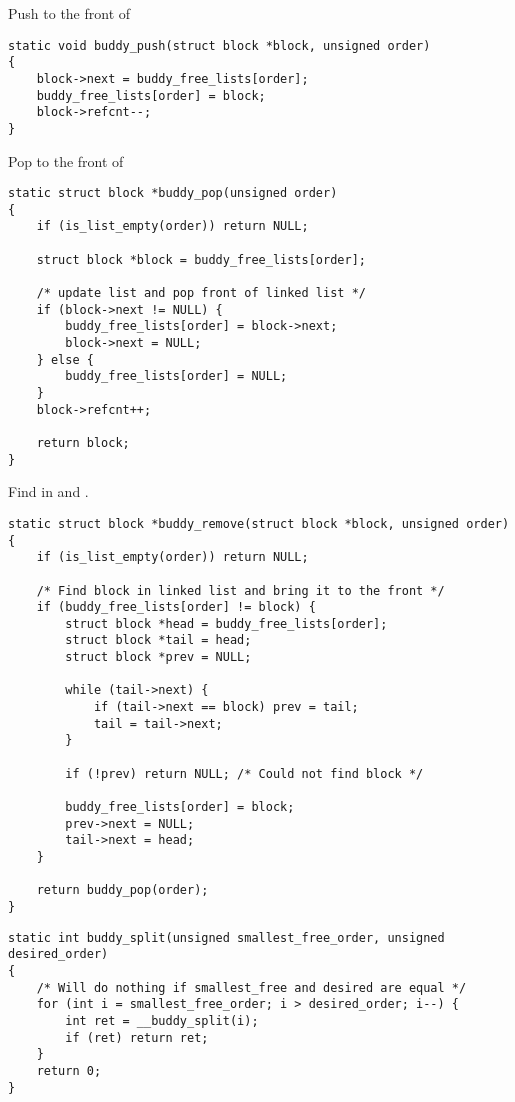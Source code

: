 \newpar{}

Push to the front of 
\begin{lstlisting}[style=bright_C++]
static void buddy_push(struct block *block, unsigned order)
{
	block->next = buddy_free_lists[order];
	buddy_free_lists[order] = block;
	block->refcnt--;
}
\end{lstlisting}

\newpar{}

Pop to the front of 
\begin{lstlisting}[style=bright_C++]
static struct block *buddy_pop(unsigned order)
{
    if (is_list_empty(order)) return NULL;

    struct block *block = buddy_free_lists[order];

    /* update list and pop front of linked list */
	if (block->next != NULL) {
		buddy_free_lists[order] = block->next;
		block->next = NULL;
	} else {
		buddy_free_lists[order] = NULL;
	}
	block->refcnt++;

    return block;
}
\end{lstlisting}

\newpar{}

Find  in   and .
\begin{lstlisting}[style=bright_C++]
static struct block *buddy_remove(struct block *block, unsigned order)
{
	if (is_list_empty(order)) return NULL;

	/* Find block in linked list and bring it to the front */
	if (buddy_free_lists[order] != block) {
		struct block *head = buddy_free_lists[order];
		struct block *tail = head;
		struct block *prev = NULL;

		while (tail->next) {
			if (tail->next == block) prev = tail;
			tail = tail->next;
		}

		if (!prev) return NULL; /* Could not find block */

		buddy_free_lists[order] = block;
		prev->next = NULL;
		tail->next = head;
	}

	return buddy_pop(order);
}
\end{lstlisting}

\newpar{}
\begin{lstlisting}[style=bright_C++]
static int buddy_split(unsigned smallest_free_order, unsigned desired_order)
{
	/* Will do nothing if smallest_free and desired are equal */
	for (int i = smallest_free_order; i > desired_order; i--) {
		int ret = __buddy_split(i);
		if (ret) return ret;
	}
	return 0;
}
\end{lstlisting}

